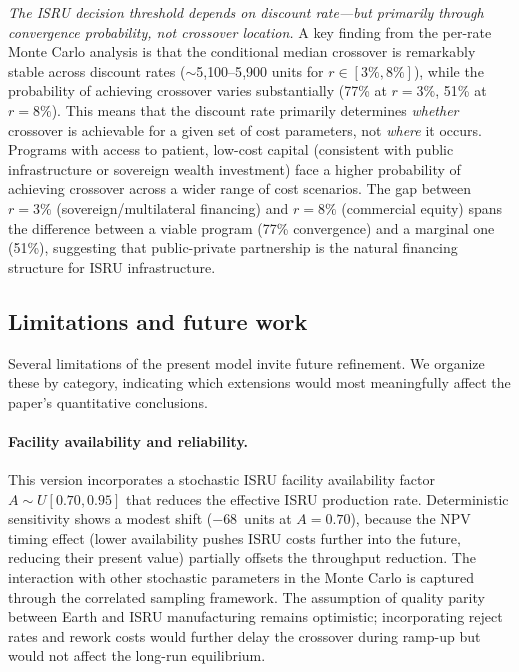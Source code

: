 \documentclass[preprint,12pt]{elsarticle}
\begin{document}
\emph{The ISRU decision threshold depends on discount rate---but primarily through convergence probability, not crossover location.} A key finding from the per-rate Monte Carlo analysis is that the conditional median crossover is remarkably stable across discount rates ($\sim$5{,}100--5{,}900 units for $r \in [3\%, 8\%]$), while the probability of achieving crossover varies substantially (77\% at $r = 3\%$, 51\% at $r = 8\%$). This means that the discount rate primarily determines \emph{whether} crossover is achievable for a given set of cost parameters, not \emph{where} it occurs. Programs with access to patient, low-cost capital (consistent with public infrastructure or sovereign wealth investment) face a higher probability of achieving crossover across a wider range of cost scenarios. The gap between $r = 3\%$ (sovereign/multilateral financing) and $r = 8\%$ (commercial equity) spans the difference between a viable program (77\% convergence) and a marginal one (51\%), suggesting that public-private partnership is the natural financing structure for ISRU infrastructure.

\subsection{Limitations and future work}

Several limitations of the present model invite future refinement. We organize these by category, indicating which extensions would most meaningfully affect the paper's quantitative conclusions.

\paragraph{Facility availability and reliability.} This version incorporates a stochastic ISRU facility availability factor $A \sim U[0.70, 0.95]$ that reduces the effective ISRU production rate. Deterministic sensitivity shows a modest shift ($-$68~units at $A = 0.70$), because the NPV timing effect (lower availability pushes ISRU costs further into the future, reducing their present value) partially offsets the throughput reduction. The interaction with other stochastic parameters in the Monte Carlo is captured through the correlated sampling framework. The assumption of quality parity between Earth and ISRU manufacturing remains optimistic; incorporating reject rates and rework costs would further delay the crossover during ramp-up but would not affect the long-run equilibrium.
\end{document}
